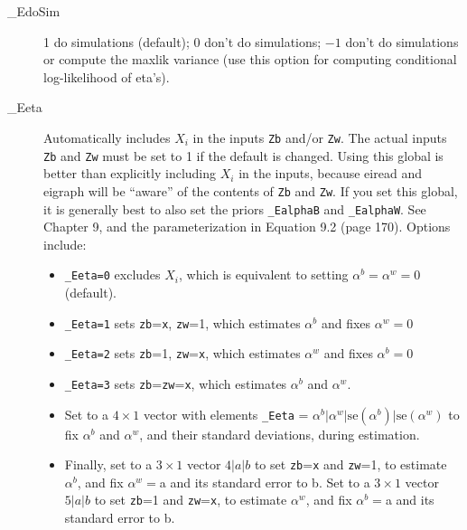 \documentclass[11pt,titlepage]{article}
\begin{document}
\begin{description}
\item[\_EdoSim] 1 do simulations (default); 0 don't do simulations;
  $-1$ don't do simulations or compute the maxlik variance (use this
  option for computing conditional log-likelihood of eta's).

\item[\_Eeta] Automatically includes $X_i$ in the inputs \texttt{Zb}
  and/or \texttt{Zw}.  The actual inputs \texttt{Zb} and \texttt{Zw}
  must be set to 1 if the default is changed.  Using this global is
  better than explicitly including $X_i$ in the inputs, because eiread
  and eigraph will be ``aware'' of the contents of \texttt{Zb} and
  \texttt{Zw}.  If you set this global, it is generally best to also
  set the priors \texttt{\_EalphaB} and \texttt{\_EalphaW}.  See
  Chapter 9, and the parameterization in Equation 9.2 (page 170).
  Options include:
  \begin{itemize}
  \item \texttt{\_Eeta=0} excludes $X_i$, which is equivalent
    to setting $\alpha^b=\alpha^w=0$ (default).
  \item \texttt{\_Eeta=1} sets \texttt{zb}=\texttt{x}, \texttt{zw}=1,
    which estimates $\alpha^b$ and fixes $\alpha^w=0$
  \item \texttt{\_Eeta=2} sets \texttt{zb}=1, \texttt{zw}=\texttt{x},
    which estimates $\alpha^w$ and fixes $\alpha^b=0$
  \item \texttt{\_Eeta=3} sets \texttt{zb}=\texttt{zw}=\texttt{x},
    which estimates $\alpha^b$ and $\alpha^w$.
  \item Set to a $4\times 1$ vector with elements \texttt{\_Eeta} =
    $\alpha^b\vert\alpha^w\vert\text{se}(\alpha^b)\vert\text{se}(\alpha^w)$
    to fix $\alpha^b$ and $\alpha^w$, and their standard deviations,
    during estimation.
  \item Finally, set to a $3\times 1$ vector $4|a|b$ to set
    \texttt{zb}=\texttt{x} and \texttt{zw}=1, to estimate $\alpha^b$,
    and fix $\alpha^w=$a and its standard error to b. Set to a
    $3\times 1$ vector $5|a|b$ to set \texttt{zb}=1 and
    \texttt{zw}=\texttt{x}, to estimate $\alpha^w$, and fix
    $\alpha^b=$a and its standard error to b.
  \end{itemize}


\end{description}
\end{document}
